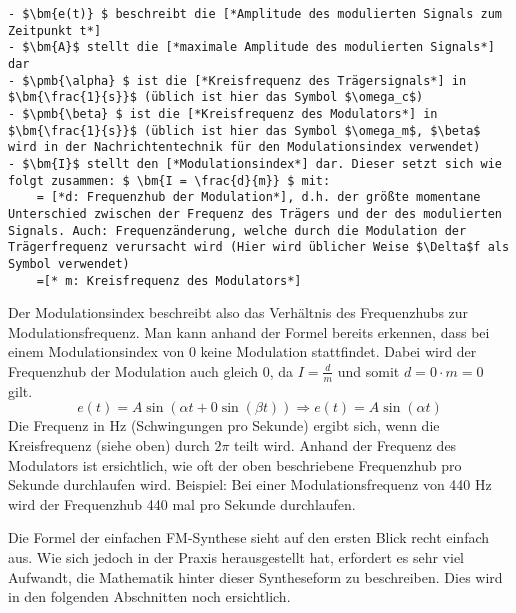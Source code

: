 \begin{lstlisting}[mathescape]
- $\bm{e(t)} $ beschreibt die [*Amplitude des modulierten Signals zum Zeitpunkt t*]
- $\bm{A}$ stellt die [*maximale Amplitude des modulierten Signals*] dar
- $\pmb{\alpha} $ ist die [*Kreisfrequenz des Trägersignals*] in $\bm{\frac{1}{s}}$ (üblich ist hier das Symbol $\omega_c$)
- $\pmb{\beta} $ ist die [*Kreisfrequenz des Modulators*] in $\bm{\frac{1}{s}}$ (üblich ist hier das Symbol $\omega_m$, $\beta$ wird in der Nachrichtentechnik für den Modulationsindex verwendet)
- $\bm{I}$ stellt den [*Modulationsindex*] dar. Dieser setzt sich wie folgt zusammen: $ \bm{I = \frac{d}{m}} $ mit:
	= [*d: Frequenzhub der Modulation*], d.h. der größte momentane Unterschied zwischen der Frequenz des Trägers und der des modulierten Signals. Auch: Frequenzänderung, welche durch die Modulation der Trägerfrequenz verursacht wird (Hier wird üblicher Weise $\Delta$f als Symbol verwendet)
	=[* m: Kreisfrequenz des Modulators*]
\end{lstlisting} \cite{chowningPaper}

Der Modulationsindex beschreibt also das Verhältnis des Frequenzhubs zur Modulationsfrequenz.
Man kann anhand der Formel bereits erkennen, dass bei einem Modulationsindex von 0 keine Modulation stattfindet. Dabei wird der Frequenzhub der Modulation auch gleich 0, da $ I=\frac{d}{m} $ und somit $ d = 0\cdot m = 0 $ gilt. 
\begin{equation} e(t) = A \sin(\alpha t + 0 \sin(\beta t))  \Rightarrow  e(t) = A \sin(\alpha t) \end{equation}
Die Frequenz in Hz (Schwingungen pro Sekunde) ergibt sich, wenn die Kreisfrequenz (siehe oben) durch $2\pi$ teilt wird.
Anhand der Frequenz des Modulators ist ersichtlich, wie oft der oben beschriebene Frequenzhub pro Sekunde durchlaufen wird. Beispiel: Bei einer Modulationsfrequenz von 440 Hz wird der Frequenzhub 440 mal pro Sekunde durchlaufen.

Die Formel der einfachen FM-Synthese sieht auf den ersten Blick recht einfach aus. Wie sich jedoch in der Praxis herausgestellt hat, erfordert es sehr viel Aufwandt, die Mathematik hinter dieser Syntheseform zu beschreiben. Dies wird in den folgenden Abschnitten noch ersichtlich. 
